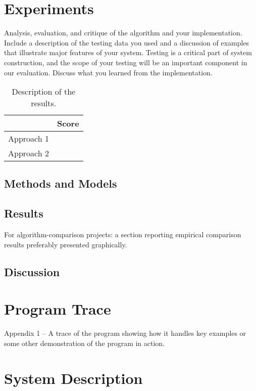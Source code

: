 \documentclass[11pt]{article}
\begin{document}
\section{Experiments}
Analysis, evaluation, and critique of the algorithm and your
implementation. Include a description of the testing data you used and
a discussion of examples that illustrate major features of your
system. Testing is a critical part of system construction, and the
scope of your testing will be an important component in our
evaluation. Discuss what you learned from the implementation.

\begin{table}
  \centering
  \begin{tabular}{ll}
    \toprule
    & Score \\
    \midrule
    Approach 1 & \\
    Approach 2 & \\
    \bottomrule
  \end{tabular}
  \caption{Description of the results.}
\end{table}

\subsection{Methods and Models}


\subsection{Results}

 For algorithm-comparison projects: a section reporting empirical comparison results preferably presented graphically.


\subsection{Discussion}


\appendix

\section{Program Trace}

Appendix 1 – A trace of the program showing how it handles key examples or some other demonstration of the program in action.

\section{System Description}
\end{document}
